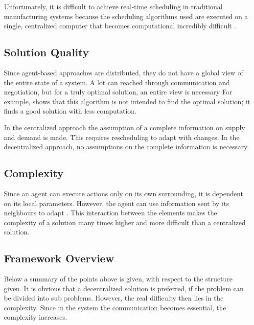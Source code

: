 Unfortunately, it is difficult to achieve real-time scheduling in traditional manufacturing systems because the scheduling algorithms used are executed on a single, centralized computer that becomes computational incredibly difficult \citep{duffie1994real}.
\subsection{Solution Quality}
Since agent-based approaches are distributed, they do not have a global view of the entire state of a system. A lot can reached through communication and negotiation, but for a truly optimal solution, an entire view is necessary For example,  \citep{palmer2003decentralized} shows that this algorithm is not intended to find the optimal solution; it finds a good solution with less computation. 

In the centralized approach the assumption of a complete information on supply and demand is made. This requires rescheduling to adapt with changes. In the decentralized approach, no assumptions on the complete information is necessary. 


\subsection{Complexity}
Since an agent can execute actions only on its own surrounding, it is dependent on its local parameters. However, the agent can use information sent by its neighbours to adapt \citep{pujolle2006autonomic}. This interaction between the elements makes the complexity of a solution many times higher and more difficult than a centralized solution.

\subsection{Framework Overview}
Below a summary of the points above is given, with respect to the structure given. It is obvious that a decentralized solution is preferred, if the problem can be divided into sub problems. However, the real difficulty then lies in the complexity. Since in the system the communication becomes essential, the complexity increases.

